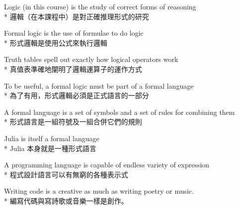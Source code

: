 \documentclass[]{article}
\begin{document}
\begin{description}
	\setlength{\itemindent}{-12pt}
	\item[*] {\color{gray}Logic (in this course) is the study of correct forms of reasoning} 
\\* 
{邏輯（在本課程中）是對正確推理形式的研究}
	\item[*] {\color{gray}Formal logic is the use of formulae to do logic} 
\\*
{形式邏輯是使用公式來執行邏輯}
	\item[*] {\color{gray}Truth tables spell out exactly how logical operators work}
\\*
{真值表準確地闡明了邏輯運算子的運作方式}
	\item[*] {\color{gray}To be useful, a formal logic must be part of a formal language}
\\*
{為了有用，形式邏輯必須是正式語言的一部分}
	\item[*] {\color{gray}A formal language is a set of symbols and a set of rules for combining them}
\\*
{形式語言是一組符號及一組合併它們的規則}
	\item[*] {\color{gray}Julia is itself a formal language}
\\*
{Julia 本身就是一種形式語言}
	\item[*] {\color{gray}A programming language is capable of endless variety of expression}
\\*
{程式設計語言可以有無窮的各種{\color{blue}表示式}}
	\item[*] {\color{gray}Writing code is a creative as much as writing poetry or music.}
\\*
{編寫代碼與寫詩歌或音樂一樣是創作。}
\end{description}
\end{document}

